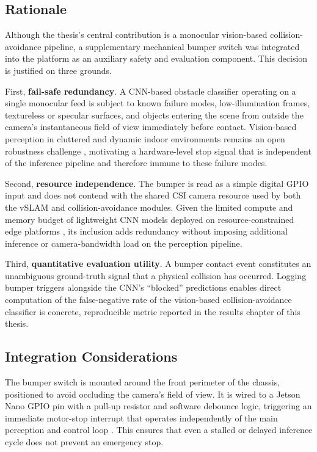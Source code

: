 \subsection{Rationale}

Although the thesis's central contribution is a monocular vision-based collision-avoidance pipeline, a supplementary mechanical bumper switch was integrated into the platform as an auxiliary safety and evaluation component. This decision is justified on three grounds.

First, \textbf{fail-safe redundancy}. A CNN-based obstacle classifier operating on a single monocular feed is subject to known failure modes, low-illumination frames, textureless or specular surfaces, and objects entering the scene from outside the camera's instantaneous field of view immediately before contact. Vision-based perception in cluttered and dynamic indoor environments remains an open robustness challenge \cite{Cadena:2016, Matthies:2017}, motivating a hardware-level stop signal that is independent of the inference pipeline and therefore immune to these failure modes.

Second, \textbf{resource independence}. The bumper is read as a simple digital GPIO input and does not contend with the shared CSI camera resource used by both the vSLAM and collision-avoidance modules. Given the limited compute and memory budget of lightweight CNN models deployed on resource-constrained edge platforms \cite{zufar:2024}, its inclusion adds redundancy without imposing additional inference or camera-bandwidth load on the perception pipeline.

Third, \textbf{quantitative evaluation utility}. A bumper contact event constitutes an unambiguous ground-truth signal that a physical collision has occurred. Logging bumper triggers alongside the CNN's ``blocked'' predictions enables direct computation of the false-negative rate of the vision-based collision-avoidance classifier is concrete, reproducible metric reported in the results chapter of this thesis.

\subsection{Integration Considerations}

The bumper switch is mounted around the front perimeter of the chassis, positioned to avoid occluding the camera's field of view. It is wired to a Jetson Nano GPIO pin with a pull-up resistor and software debounce logic, triggering an immediate motor-stop interrupt that operates independently of the main perception and control loop \cite{JetsonUserManual:2020}. This ensures that even a stalled or delayed inference cycle does not prevent an emergency stop.


